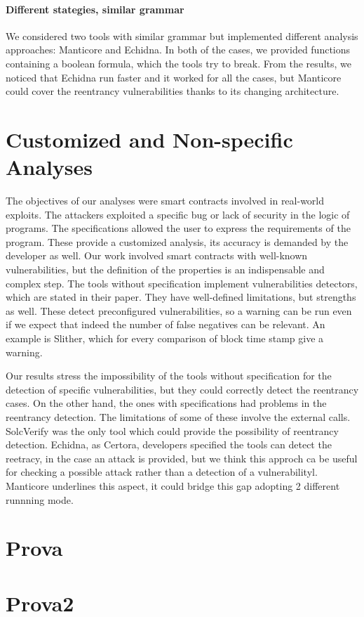 \paragraph{Different stategies, similar grammar}
We considered two tools with similar grammar but implemented different analysis approaches: Manticore and Echidna. 
In both of the cases, we provided functions containing a boolean formula, which the tools try to break. From the results, 
we noticed that Echidna run faster and it worked for all the cases, but Manticore could cover the reentrancy vulnerabilities thanks to its changing architecture.


\section{Customized and Non-specific Analyses}
The objectives of our analyses were smart contracts involved in real-world exploits. The attackers exploited a specific bug or lack of security in the logic of programs. The specifications allowed the user to express the requirements of the program. These provide a customized analysis, its accuracy is demanded by the developer as well. Our work involved smart contracts with well-known vulnerabilities, but the definition of the properties is an indispensable and complex step.
The tools without specification implement vulnerabilities detectors, which are stated in their paper. They have well-defined limitations, but strengths as well. These detect preconfigured vulnerabilities, so a warning can be run even if we expect that indeed the number of false negatives can be relevant.
An example is Slither, which for every comparison of block time stamp give a warning. 

Our results stress the impossibility of the tools without specification for the detection of specific vulnerabilities, but they could correctly detect the reentrancy cases. 
On the other hand, the ones with specifications had problems in the reentrancy detection. The limitations of some of these involve the external calls. 
SolcVerify was the only tool which could provide the possibility of reentrancy detection. Echidna, as Certora, developers specified the tools  can detect the reetracy, in the case an attack is provided, 
but we think this approch ca be useful for checking a possible attack rather than a detection of a vulnerabilityl.
Manticore underlines this aspect, it could bridge this gap adopting 2 different runnning mode. 


\section{Prova }

\section{Prova2}
